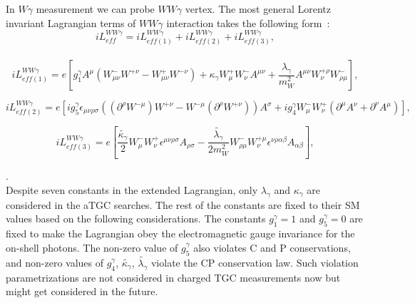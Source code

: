 In $W\gamma$ measurement we can probe $WW\gamma$ vertex. The most general Lorentz invariant Lagrangian terms of $WW\gamma$ interaction takes the following form~\cite{ref_theory_aTGC}:\\

\begin{equation}\label{L_ATGC}
i L_{eff}^{WW\gamma}= i L_{eff(1)}^{WW\gamma} + i L_{eff(2)}^{WW\gamma} + i L_{eff(3)}^{WW\gamma},
\end{equation}
\\

\begin{equation}\label{L_ATGC_1}
i L_{eff(1)}^{WW\gamma}= e [ g_1^{\gamma} A^\mu (W_{\mu\nu}^- W^{+\nu} - W_{\mu\nu}^+ W^{-\nu}) + \kappa_\gamma W_{\mu}^+ W_{\nu}^- A^{\mu\nu} + {\frac{\lambda_\gamma}{m^2_W}} A^{\mu\nu} W_\nu^{+\rho} W_{\rho\mu}^- ],
\end{equation}

\begin{equation}\label{L_ATGC_2}
i L_{eff(2)}^{WW\gamma}= e [ i g_5^\gamma \epsilon_{\mu\nu\rho\sigma}((\partial^\rho W^{-\mu})W^{+\nu} - W^{-\mu}(\partial^{\rho}W^{+\nu}))A^\sigma + i g_4^\gamma W_\mu^- W_\nu^+ (\partial^\mu A^\nu + \partial^\nu A^\mu) ],
\end{equation}

\begin{equation}\label{L_ATGC_3}
i L_{eff(3)}^{WW\gamma}= e [ \frac{\tilde{\kappa_\gamma}}{2} W_\mu^- W_\nu^+ \epsilon^{\mu\nu\rho\sigma} A_{\rho\sigma} - \frac{\tilde{\lambda_\gamma}}{2 m_W^2} W_{\rho\mu}^- W^{+\mu}_{\nu} \epsilon^{\nu\rho\alpha\beta} A_{\alpha\beta}],
\end{equation}

.\\

Despite seven constants in the extended Lagrangian, only $\lambda_\gamma$ and $\kappa_\gamma$ are considered in the aTGC searches. The rest of the constants are fixed to their SM values based on the following considerations. The constants $g_1^\gamma=1$ and $g_5^\gamma=0$ are fixed to make the Lagrangian obey the electromagnetic gauge invariance for the on-shell photons. The non-zero value of $g_5^\gamma$ also violates C and P conservations, and non-zero values of $g_4^\gamma$, $\tilde{\kappa_\gamma}$, $\tilde{\lambda_\gamma}$ violate the CP conservation law. Such violation parametrizations are not considered in charged TGC measurements now but might get considered in the future.\\

